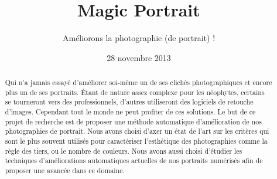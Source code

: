 \documentclass[11pt, french]{report-rd-info}
\begin{document}
\title{Magic Portrait}
\subtitle{Améliorons la photographie (de portrait) !}
\date{28 novembre 2013}


\begin{abstract}
Qui n'a jamais essayé d'améliorer soi-même un de ses clichés photographiques et encore plus un de ses portraits. Étant de nature assez complexe pour les néophytes, certains se tourneront vers des professionnels, d'autres utiliseront des logiciels de retouche d'images. Cependant tout le monde ne peut profiter de ces solutions.  Le but de ce projet de recherche est de proposer une méthode automatique d'amélioration de nos photographies de portrait. Nous avons choisi d'axer un état de l'art sur les critères qui sont le plus souvent utilisés pour caractériser l'esthétique des photographies comme la règle des tiers, ou le nombre de couleurs. Nous avons aussi choisi d'étudier les techniques d'améliorations automatiques actuelles de nos portraits numérisés afin de proposer une avancée dans ce domaine. 

\end{abstract}
\end{document}
